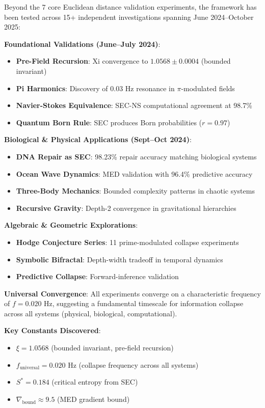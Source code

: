 \documentclass[11pt,a4paper]{article}
\begin{document}
Beyond the 7 core Euclidean distance validation experiments, the framework has been tested across 15+ independent investigations spanning June 2024--October 2025:

\textbf{Foundational Validations (June--July 2024)}:
\begin{itemize}
    \item \textbf{Pre-Field Recursion}: Xi convergence to $1.0568 \pm 0.0004$ (bounded invariant)
    \item \textbf{Pi Harmonics}: Discovery of 0.03 Hz resonance in $\pi$-modulated fields
    \item \textbf{Navier-Stokes Equivalence}: SEC-NS computational agreement at 98.7\%
    \item \textbf{Quantum Born Rule}: SEC produces Born probabilities ($r=0.97$)
\end{itemize}

\textbf{Biological \& Physical Applications (Sept--Oct 2024)}:
\begin{itemize}
    \item \textbf{DNA Repair as SEC}: 98.23\% repair accuracy matching biological systems
    \item \textbf{Ocean Wave Dynamics}: MED validation with 96.4\% predictive accuracy
    \item \textbf{Three-Body Mechanics}: Bounded complexity patterns in chaotic systems
    \item \textbf{Recursive Gravity}: Depth-2 convergence in gravitational hierarchies
\end{itemize}

\textbf{Algebraic \& Geometric Explorations}:
\begin{itemize}
    \item \textbf{Hodge Conjecture Series}: 11 prime-modulated collapse experiments
    \item \textbf{Symbolic Bifractal}: Depth-width tradeoff in temporal dynamics
    \item \textbf{Predictive Collapse}: Forward-inference validation
\end{itemize}

\textbf{Universal Convergence}: All experiments converge on a characteristic frequency of $f = 0.020$ Hz, suggesting a fundamental timescale for information collapse across all systems (physical, biological, computational).

\textbf{Key Constants Discovered}:
\begin{itemize}
    \item $\xi = 1.0568$ (bounded invariant, pre-field recursion)
    \item $f_{\text{universal}} = 0.020$ Hz (collapse frequency across all systems)
    \item $S^* = 0.184$ (critical entropy from SEC)
    \item $\nabla_{\text{bound}} \approx 9.5$ (MED gradient bound)
\end{itemize}
\end{document}
